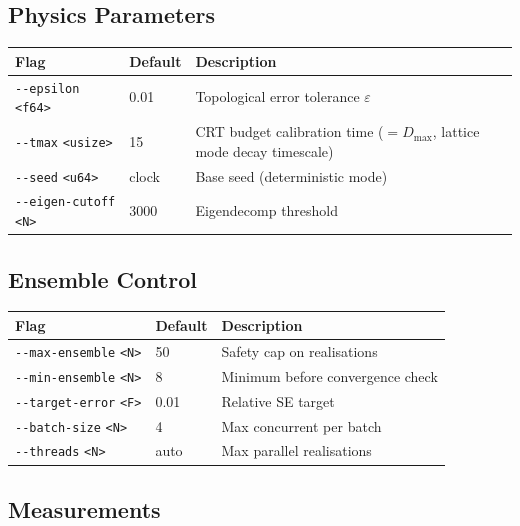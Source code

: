 \documentclass[11pt, a4paper, openany]{book}
\newcommand{\code}[1]{\texttt{#1}}
\newcommand{\flag}[1]{\texttt{-{}-#1}}
\begin{document}
\subsection{Physics Parameters}

\begin{longtable}{llp{8cm}}
  \toprule
  \textbf{Flag} & \textbf{Default} & \textbf{Description} \\
  \midrule
  \flag{epsilon} \code{<f64>}  & 0.01  & Topological error tolerance $\varepsilon$ \\
  \flag{tmax} \code{<usize>}   & 15    & CRT budget calibration time ($= D_{\max}$, lattice mode decay timescale) \\
  \flag{seed} \code{<u64>}     & clock & Base seed (deterministic mode) \\
  \flag{eigen-cutoff} \code{<N>} & 3000 & Eigendecomp threshold \\
  \bottomrule
\end{longtable}

\subsection{Ensemble Control}

\begin{longtable}{llp{8cm}}
  \toprule
  \textbf{Flag} & \textbf{Default} & \textbf{Description} \\
  \midrule
  \flag{max-ensemble} \code{<N>} & 50   & Safety cap on realisations \\
  \flag{min-ensemble} \code{<N>} & 8    & Minimum before convergence check \\
  \flag{target-error} \code{<F>} & 0.01 & Relative SE target \\
  \flag{batch-size} \code{<N>}   & 4    & Max concurrent per batch \\
  \flag{threads} \code{<N>}      & auto & Max parallel realisations \\
  \bottomrule
\end{longtable}

\subsection{Measurements}
\end{document}
